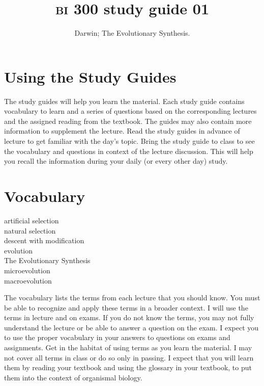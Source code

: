 \documentclass[letterpaper]{tufte-handout}
\title{{\scshape bi} 300 study guide 01\hfill}
\author{Darwin; The Evolutionary Synthesis.}
\date{} %
\begin{document}
\maketitle	%


\section{Using the Study Guides}
The	study guides will help you learn the material.  Each study guide contains vocabulary to learn and a series of questions based on the corresponding lectures and the assigned reading from the textbook.  The guides may also contain more information to supplement the lecture.  Read the study guides in advance of lecture to get familiar with the day's topic. Bring the study guide to class to see the vocabulary and questions in context of the lecture discussion.  This will help you recall the information during your daily (or every other day) study.


\section{Vocabulary}
\vspace{-1\baselineskip}
\begin{multicols}{2}
artificial selection\\
natural selection\\
descent with modification\\
evolution\\
The Evolutionary Synthesis\\
microevolution\\
macroevolution
\end{multicols}


\noindent The vocabulary lists the terms from each lecture that you should know. You must be able to recognize and apply these terms in a broader context.  I will use the terms in lecture and on exams. If you do not know the terms, you may not fully understand the lecture or be able to answer a question on the exam. I expect you to use the proper vocabulary in your answers to questions on exams and assignments.  Get in the habitat of using terms as you learn the material.  I may not cover all terms in class or do so only in passing.  I expect that you will learn them by reading your textbook and using the glossary in your textbook, to put them into the context of organismal biology.
\end{document}

